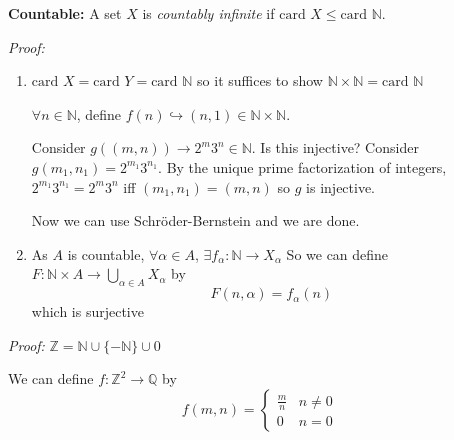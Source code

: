 \documentclass[12pt]{report}
\newcommand{\Z}{\mathbb{Z}}
\newcommand{\N}{\mathbb{N}}
\newcommand{\Q}{\mathbb{Q}}
\newcommand{\card}{\text{card }}
\newcommand{\inj}{\hookrightarrow}
\newenvironment*{tbox}[2][gray]{
    \begin{tcolorbox}[
        parbox=false,
        colback=#1!5!white,
        colframe=#1!75!black,
        breakable,
        title={#2}
    ]}
    {\end{tcolorbox}}
\begin{document}
    \textbf{Countable:} A set $X$ is \emph{countably infinite} if $\card X \leq \card \N$.

    \begin{tbox}{\textbf{Proposition:} 
        \begin{enumerate}[label=(\alph*)]
            \item If $X$ and $Y$ are countable, so is $X \times Y$.
            \item If $A$ is countable and $X_{\alpha}$ is countable for every $\alpha \in A$, then $\bigcup_{\alpha \in A} X_{\alpha}$ is countable.
        \end{enumerate}}
        \emph{Proof:} 
        \begin{enumerate}[label=(\alph*)]
            \item $\card X = \card Y =\card \N$ so it suffices to show $\N \times \N = \card \N$ 
            
            $\forall n \in \N$, define $f(n) \inj (n, 1) \in \N \times \N$.

            \color{red}
            Consider $g((m, n)) \to 2^m 3^n \in \N$. Is this injective? Consider $g(m_1, n_1) = 2^{m_1} 3^{n_1}$. By the unique prime factorization of integers, $2^{m_1} 3^{n_1} = 2^m 3^n$ iff $(m_1, n_1) = (m, n)$ so $g$ is injective.

            Now we can use Schröder-Bernstein and we are done. 

            \item As $A$ is countable, $\forall \alpha \in A$, $\exists f_{\alpha}: \N \to X_{\alpha}$ So we can define $F: \N \times A \to \bigcup_{\alpha \in A} X_{\alpha}$ by 
            \[F(n, \alpha) = f_{\alpha}(n)\]
            which is surjective 

            \color{black}

        \end{enumerate}

    \end{tbox}

    \begin{tbox}{\textbf{Corollary:} $\Z$ and $\Q$ are countable}
        \emph{Proof:} $\Z = \N \cup \{-\N\} \cup 0$ 

        We can define $f: \Z^2 \to \Q$ by 
        \[f(m, n) = \begin{cases}
            \frac{m}{n} & n \neq 0\\
            0 & n = 0 
        \end{cases}\] 
    \end{tbox}
\end{document}
